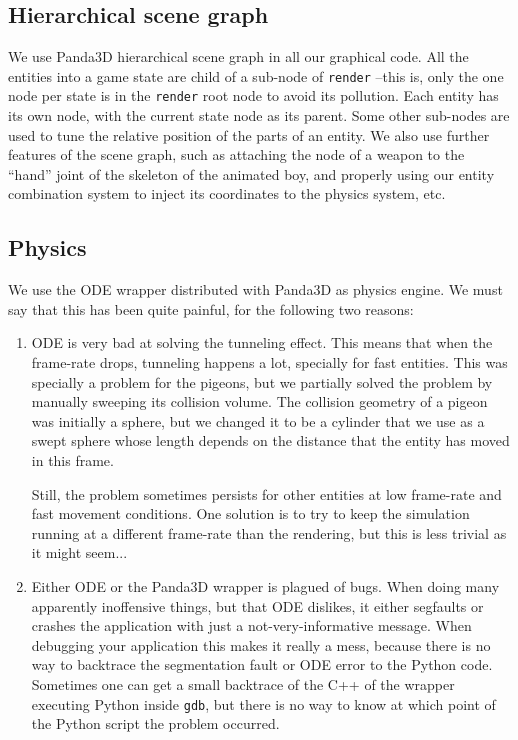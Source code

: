 \documentclass[a4paper,10pt]{article}
\begin{document}
\subsection{Hierarchical scene graph}

We use Panda3D hierarchical scene graph in all our graphical code. All
the entities into a game state are child of a sub-node of
\texttt{render} --this is, only the one node per state is in the
\texttt{render} root node to avoid its pollution. Each entity has its
own node, with the current state node as its parent. Some other
sub-nodes are used to tune the relative position of the parts of an
entity. We also use further features of the scene graph, such as
attaching the node of a weapon to the ``hand'' joint of the skeleton
of the animated boy, and properly using our entity combination system
to inject its coordinates to the physics system, etc.

\subsection{Physics}

We use the ODE wrapper distributed with Panda3D as physics engine. We
must say that this has been quite painful, for the following two
reasons:

\begin{enumerate}
\item ODE is very bad at solving the tunneling effect. This means that
  when the frame-rate drops, tunneling happens a lot, specially for
  fast entities. This was specially a problem for the pigeons, but we
  partially solved the problem by manually sweeping its collision
  volume\cite{sweeping}. The collision geometry of a pigeon was
  initially a sphere, but we changed it to be a cylinder that we use
  as a swept sphere whose length depends on the distance that the
  entity has moved in this frame.

  Still, the problem sometimes persists for other entities at low
  frame-rate and fast movement conditions. One solution is to try to
  keep the simulation running at a different frame-rate than the
  rendering, but this is less trivial as it might seem...

\item Either ODE or the Panda3D wrapper is plagued of bugs. When doing
  many apparently inoffensive things, but that ODE dislikes, it
  either segfaults or crashes the application with just a
  not-very-informative message. When debugging your application this
  makes it really a mess, because there is no way to backtrace the
  segmentation fault or ODE error to the Python code. Sometimes one
  can get a small backtrace of the C++ of the wrapper executing Python
  inside \texttt{gdb}, but there is no way to know at which point of
  the Python script the problem occurred.
\end{enumerate}
\end{document}
